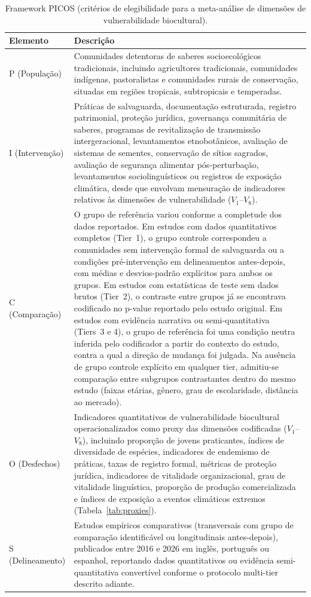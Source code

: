 \documentclass[12pt,a4paper]{article}
\begin{document}
\begin{table}[htbp]
\caption{Framework PICOS (critérios de elegibilidade para a meta-análise de dimensões de vulnerabilidade biocultural).}
\label{tab:picos}
\centering
\small
\begin{tabular}{p{3.5cm} p{9.5cm}}
\toprule
\textbf{Elemento} & \textbf{Descrição} \\
\midrule
P (População) & Comunidades detentoras de saberes socioecológicos tradicionais, incluindo agricultores tradicionais, comunidades indígenas, pastoralistas e comunidades rurais de conservação, situadas em regiões tropicais, subtropicais e temperadas. \\
I (Intervenção) & Práticas de salvaguarda, documentação estruturada, registro patrimonial, proteção jurídica, governança comunitária de saberes, programas de revitalização de transmissão intergeracional, levantamentos etnobotânicos, avaliação de sistemas de sementes, conservação de sítios sagrados, avaliação de segurança alimentar pós-perturbação, levantamentos sociolinguísticos ou registros de exposição climática, desde que envolvam mensuração de indicadores relativos às dimensões de vulnerabilidade ($V_1$--$V_8$). \\
C (Comparação) & O grupo de referência variou conforme a completude dos dados reportados. Em estudos com dados quantitativos completos (Tier~1), o grupo controle correspondeu a comunidades sem intervenção formal de salvaguarda ou a condições pré-intervenção em delineamentos antes-depois, com médias e desvios-padrão explícitos para ambos os grupos. Em estudos com estatísticas de teste sem dados brutos (Tier~2), o contraste entre grupos já se encontrava codificado no p-value reportado pelo estudo original. Em estudos com evidência narrativa ou semi-quantitativa (Tiers~3 e 4), o grupo de referência foi uma condição neutra inferida pelo codificador a partir do contexto do estudo, contra a qual a direção de mudança foi julgada. Na ausência de grupo controle explícito em qualquer tier, admitiu-se comparação entre subgrupos contrastantes dentro do mesmo estudo (faixas etárias, gênero, grau de escolaridade, distância ao mercado). \\
O (Desfechos) & Indicadores quantitativos de vulnerabilidade biocultural operacionalizados como proxy das dimensões codificadas ($V_1$--$V_8$), incluindo proporção de jovens praticantes, índices de diversidade de espécies, indicadores de endemismo de práticas, taxas de registro formal, métricas de proteção jurídica, indicadores de vitalidade organizacional, grau de vitalidade linguística, proporção de produção comercializada e índices de exposição a eventos climáticos extremos (Tabela~\ref{tab:proxies}). \\
S (Delineamento) & Estudos empíricos comparativos (transversais com grupo de comparação identificável ou longitudinais antes-depois), publicados entre 2016 e 2026 em inglês, português ou espanhol, reportando dados quantitativos ou evidência semi-quantitativa convertível conforme o protocolo multi-tier descrito adiante. \\
\bottomrule
\end{tabular}
\end{table}
\end{document}
